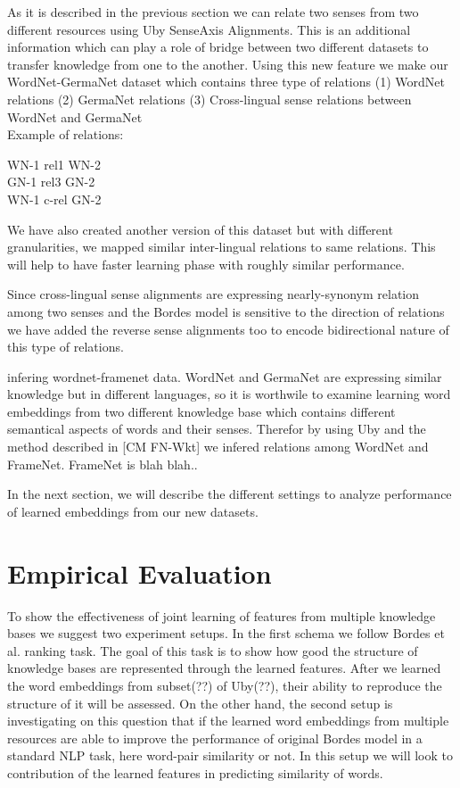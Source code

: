 \documentclass[preprint,12pt]{elsarticle}
\begin{document}
As it is described in the previous section we can relate two senses from two different resources using Uby SenseAxis Alignments.
This is an additional information which can play a role of bridge between two different datasets to transfer knowledge from one to the another.
Using this new feature we make our WordNet-GermaNet dataset which contains three type of relations 
(1) WordNet relations 
(2) GermaNet relations
(3) Cross-lingual sense relations between WordNet and GermaNet
\\
Example of relations:
\begin{center}
WN-1 \hspace{0.5in}  rel1 \hspace{0.5in}   WN-2\\
GN-1 \hspace{0.5in} rel3 \hspace{0.5in}  GN-2\\
WN-1 \hspace{0.5in} c-rel \hspace{0.5in} GN-2\\
\end{center}

We have also created another version of this dataset but with different granularities, we mapped similar inter-lingual relations to same relations.
This will help to have faster learning phase with roughly similar performance.

Since cross-lingual sense alignments are expressing nearly-synonym relation among two senses and the Bordes model is sensitive to the direction of relations
we have added the reverse sense alignments too to encode bidirectional nature of this type of relations.

infering wordnet-framenet data. 
WordNet and GermaNet are expressing similar knowledge but in different languages, so it is worthwile to examine
learning word embeddings from two different knowledge base which contains different semantical aspects of words and their senses. 
Therefor by using Uby and the method described in [CM FN-Wkt] we infered relations among WordNet and FrameNet. FrameNet is blah blah..

In the next section, we will describe the different settings to analyze performance of learned embeddings from our new datasets.

\section{Empirical Evaluation}
\label{sec:exp}
To show the effectiveness of joint learning of features from multiple knowledge bases we suggest 
two experiment setups. In the first schema we follow Bordes et al. ranking task. The goal of this task is
to show how good the structure of knowledge bases are represented through the learned features. 
After we learned the word embeddings from subset(??) of Uby(??),
 their ability to reproduce the structure of it will be assessed. On the other hand, the second
  setup is investigating on this question that if the learned word embeddings from multiple resources
   are able to improve the performance of original Bordes model in a standard NLP task, here word-pair similarity or not.
    In this setup we will look to contribution of the learned features in predicting similarity of words.
\end{document}
